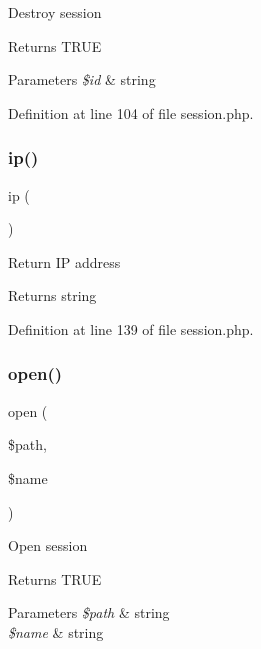 Destroy session \begin{DoxyReturn}{Returns}
T\+R\+UE 
\end{DoxyReturn}

\begin{DoxyParams}{Parameters}
{\em \$id} & string \\
\hline
\end{DoxyParams}


Definition at line 104 of file session.\+php.

\hypertarget{class_d_b_1_1_s_q_l_1_1_session_a197bae3714812901860bd006b00f91de}{}\label{class_d_b_1_1_s_q_l_1_1_session_a197bae3714812901860bd006b00f91de} 
\subsubsection{\texorpdfstring{ip()}{ip()}}
{\footnotesize\ttfamily ip (\begin{DoxyParamCaption}{ }\end{DoxyParamCaption})}

Return IP address \begin{DoxyReturn}{Returns}
string 
\end{DoxyReturn}


Definition at line 139 of file session.\+php.

\hypertarget{class_d_b_1_1_s_q_l_1_1_session_a037c59224bcb347b69ca61df88ef7230}{}\label{class_d_b_1_1_s_q_l_1_1_session_a037c59224bcb347b69ca61df88ef7230} 
\subsubsection{\texorpdfstring{open()}{open()}}
{\footnotesize\ttfamily open (\begin{DoxyParamCaption}\item[{}]{\$path,  }\item[{}]{\$name }\end{DoxyParamCaption})}

Open session \begin{DoxyReturn}{Returns}
T\+R\+UE 
\end{DoxyReturn}

\begin{DoxyParams}{Parameters}
{\em \$path} & string \\
\hline
{\em \$name} & string \\
\hline
\end{DoxyParams}


